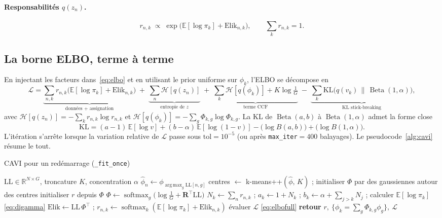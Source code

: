 \documentclass[11pt,a4paper]{article}
\DeclareMathOperator*{\argmax}{arg\,max}
\DeclareMathOperator{\Bdist}{Beta}
\newcommand{\E}{\mathbb{E}}
\newcommand{\KL}{\mathrm{KL}}
\newcommand{\softmax}{\operatorname{softmax}}
\newcommand{\code}[1]{\texttt{#1}}
\newcommand{\Rmat}{\mathbf{R}}
\newcommand{\R}{\mathbb{R}}
\theoremstyle{remark}
\begin{document}
\paragraph{Responsabilités $q(z_n)$.}
\begin{equation}\label{eq:rupdate}
r_{n,k}\;\propto\;\exp\!\Big(\E[\log\pi_k]+\mathrm{Elik}_{n,k}\Big),
\qquad \sum_k r_{n,k}=1.
\end{equation}

\subsection{La borne ELBO, terme à terme}

En injectant les facteurs dans~\eqref{eq:elbo} et en utilisant le prior uniforme sur
$\phi_k$, l'ELBO se décompose en
\begin{equation}\label{eq:elbofull}
\mathcal{L}=
\underbrace{\sum_{n,k} r_{n,k}\big(\E[\log\pi_k]+\mathrm{Elik}_{n,k}\big)}_{\text{données + assignation}}
\;+\;\underbrace{\sum_{n} \mathcal H[q(z_n)]}_{\text{entropie de }z}
\;+\;\underbrace{\sum_{k}\mathcal H[q(\phi_k)] + K\log\tfrac1G}_{\text{terme CCF}}
\;-\;\underbrace{\sum_{k}\KL\!\big(q(v_k)\,\|\,\Bdist(1,\alpha)\big)}_{\text{KL stick-breaking}},
\end{equation}
avec $\mathcal H[q(z_n)]=-\sum_k r_{n,k}\log r_{n,k}$ et
$\mathcal H[q(\phi_k)]=-\sum_g\Phi_{k,g}\log\Phi_{k,g}$. La KL de
$\Bdist(a,b)$ à $\Bdist(1,\alpha)$ admet la forme close
\begin{equation}\label{eq:klbeta}
\KL=(a-1)\,\E[\log v]+(b-\alpha)\,\E[\log(1-v)]
-\big(\log B(a,b)\big)+\big(\log B(1,\alpha)\big).
\end{equation}
L'itération s'arrête lorsque la variation relative de $\mathcal L$ passe sous
$\text{tol}=10^{-5}$ (ou après \code{max\_iter}$=400$ balayages). Le
pseudocode~\ref{alg:cavi} résume le tout.

\begin{algorithm}[t]
\caption{CAVI pour un redémarrage (\code{\_fit\_once})}
\label{alg:cavi}
\begin{algorithmic}[1]
\REQUIRE $\mathrm{LL}\in\R^{N\times G}$, troncature $K$, concentration $\alpha$
\STATE $\hat\phi_n\gets \phi_{\argmax_g \mathrm{LL}[n,g]}$ 
\STATE centres $\gets$ k-means++$(\hat\phi,\,K)$ ; initialiser $\Phi$ par des gaussiennes autour des centres
\STATE initialiser $r$ depuis $\Phi$ 
\REPEAT
  \STATE $\Phi \gets \softmax_g\big(\log\tfrac1G + \Rmat^{\!\top}\mathrm{LL}\big)$ 
  \STATE $N_k\gets\sum_n r_{n,k}$ ; $a_k\gets 1+N_k$ ; $b_k\gets\alpha+\sum_{j>k}N_j$ ; calculer $\E[\log\pi_k]$ \eqref{eq:digamma}
  \STATE $\mathrm{Elik}\gets \mathrm{LL}\,\Phi^{\!\top}$ ; $r_{n,k}\gets\softmax_k(\E[\log\pi_k]+\mathrm{Elik}_{n,k})$ \COMMENT{\eqref{eq:rupdate}}
  \STATE évaluer $\mathcal L$ \eqref{eq:elbofull}
\STATE \textbf{retour} $r,\ \{\phi_k=\sum_g\Phi_{k,g}\phi_g\},\ \mathcal L$
\end{algorithmic}
\end{algorithm}
\end{document}
